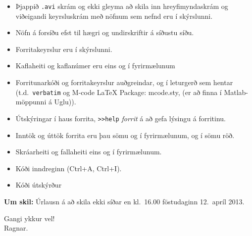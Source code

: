 \documentclass[11pt,icelandic]{article}
\begin{document}
\begin{itemize}
 \item Þjappið {\tt .avi} skrám og ekki gleyma að skila inn 
hreyfimyndaskrám og viðeigandi keyrsluskrám með nöfnum
sem nefnd eru í skýrslunni.
 \item Nöfn á forsíðu efst til hægri og undirskriftir á síðustu síðu.
 \item Forritakeyrslur eru í skýrslunni.
 \item Kaflaheiti og kaflanúmer eru eins og í fyrirmælunum
 \item Forritunarkóði og forritakeyrslur auðgreindar, og í leturgerð
sem hentar (t.d.~\verb=verbatim= og M-code LaTeX Package: mcode.sty,
(er að finna í Matlab-möppunni á Uglu)).
 \item Útskýringar í haus forrita, \verb=>>help= \emph{forrit} á að gefa
lýsingu á forritinu.
 \item Inntök og úttök forrita eru þau sömu og í fyrirmælunum, og í sömu röð.
 \item Skráarheiti og fallaheiti eins og í fyrirmælunum.
 \item Kóði inndreginn (Ctrl+A, Ctrl+I).
 \item Kóði útskýrður
\end{itemize}



\smallskip
\textbf{\large Um skil:}  Úrlausn á að skila ekki síðar en 
 kl.~16.00 föstudaginn 12.~apríl 2013.


\bigskip
Gangi ykkur vel! \\
Ragnar. 
\end{document}
